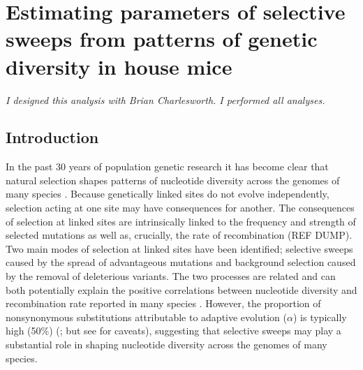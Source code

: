 \chapter{Estimating parameters of selective sweeps from patterns of genetic diversity in house mice}

\textit{I designed this analysis with Brian Charlesworth. I performed all analyses.
}

%
%

\section*{Introduction}

In the past 30 years of population genetic research it has become clear that natural selection shapes patterns of nucleotide diversity across the genomes of many species \citep{RN154, RN117}. Because genetically linked sites do not evolve independently, selection acting at one site may have consequences for another. The consequences of selection at linked sites are intrinsically linked to the frequency and strength of selected mutations as well as, crucially, the rate of recombination (REF DUMP). Two main modes of selection at linked sites have been identified; selective sweeps caused by the spread of advantageous mutations and background selection caused by the removal of deleterious variants. The two processes are related and can both potentially explain the positive correlations between nucleotide diversity and recombination rate reported in many species \citep{RN117}. However, the proportion of nonsynonymous substitutions attributable to adaptive evolution ($\alpha$) is typically high (50\%) (\citealt{RN215}; but see \citealt{RN352} for caveats), suggesting that selective sweeps may play a substantial role in shaping nucleotide diversity across the genomes of many species.

